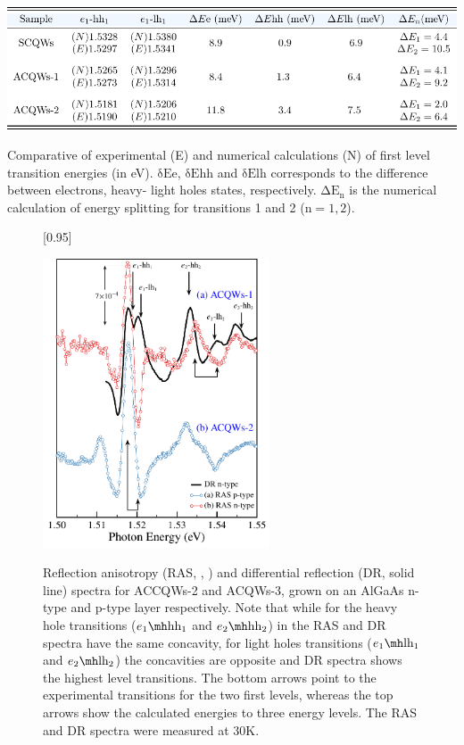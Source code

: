 \begin{table}[t]
	\centering
	\includegraphics[width=\textwidth]{../tables/chapter-3/table-ras/build-ruco/table-ras.pdf}
	\caption{Comparative of experimental (E) and numerical calculations (N) of first level transition  energies (in eV). $\mathrm{\delta Ee}$, $\mathrm{\delta Ehh}$ and $\mathrm{\delta Elh}$ corresponds to the difference between electrons, heavy- light holes states, respectively. $\mathrm{\Delta E_n}$ is the numerical calculation of energy splitting for transitions 1 and 2 ($ \mathrm{n}=1,2$).}
	\label{tab:sec-chapter-3-ras-table} 
\end{table}
\begin{figure}
	[0.95\FBwidth]
	{\caption{Reflection anisotropy (RAS, ,  ) and differential reflection (DR, solid line) spectra for ACCQWs-2 and ACQWs-3,  grown on an AlGaAs n-type  and  p-type layer respectively. Note that while for the heavy hole transitions ($\thh{1}{1}$ and  $\thh{2}{2}$) in the RAS and DR spectra have the same concavity, for light holes transitions ($\tlh{1}{1}$ and  $\tlh{2}{2}$) the concavities are opposite and DR spectra shows the highest level transitions. The bottom arrows point to the experimental transitions for the two first levels, whereas the top arrows show the calculated energies to three energy levels.  The RAS and DR spectra were measured at 30K.}\label{fig:chapter-3-subsec-ras-plots-set-4}}
	{
	\includegraphics[width=0.6\textwidth]{../figures/chapter-3/ras-plots/build-ruco/ras-set-4.pdf}
	\label{subfig:chapter-3-subsubsec-ras-strength-set-4-a}
	\label{subfig:chapter-3-subsubsec-ras-strength-set-4-b}
	}
\end{figure}

